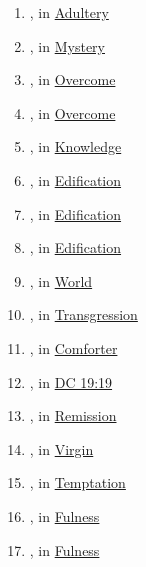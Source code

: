 \begin{enumerate}
		\item \hyperref[MOICHEUO]{}, in \hyperref[ADULTERY]{Adultery}
		
		\item \hyperref[MUSTERION]{}, in \hyperref[MYSTERY]{Mystery}
		
		\item \hyperref[NIKAO]{}, in \hyperref[OVERCOME]{Overcome}
		
		\item \hyperref[NIKE]{}, in \hyperref[OVERCOME]{Overcome}
		
		\item \hyperref[OIDA]{}, in \hyperref[KNOWLEDGE]{Knowledge}
		
		\item \hyperref[OIKODOMEO]{}, in \hyperref[EDIFICATION]{Edification}
		
		\item \hyperref[OIKODOME]{}, in \hyperref[EDIFICATION]{Edification}
		
		\item \hyperref[OIKONOMIA]{}, in \hyperref[EDIFICATION]{Edification}
		
		\item \hyperref[OIKOUMENE]{}, in \hyperref[WORLD]{World}
		
		\item \hyperref[PARABASIS]{}, in \hyperref[TRANSGRESSION]{Transgression}
		
		\item \hyperref[PARAKLETOS]{}, in \hyperref[COMFORTER]{Comforter}
		
		\item \hyperref[DC19-19]{}, in \hyperref[DC19-19]{DC 19:19}
		
		\item \hyperref[PARESIS]{}, in \hyperref[REMISSION]{Remission}
		
		\item \hyperref[PARTHENOS]{}, in \hyperref[VIRGIN]{Virgin}
		
		\item \hyperref[PEIRAZO]{}, in \hyperref[TEMPTATION]{Temptation}
		
		\item \hyperref[PLEROO]{}, in \hyperref[FULNESS]{Fulness}
		
		\item \hyperref[PLEROMA]{}, in \hyperref[FULNESS]{Fulness}
		

\end{enumerate}
